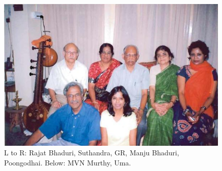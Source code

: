 \begin{figure}[h]
\centering
\includegraphics[width=1\textwidth]{images/Rajaji-family.jpg}
\caption{\small{L to R: Rajat Bhaduri, Suthandra, GR, Manju Bhaduri, Poongodhai.
Below: MVN Murthy, Uma.}}
\end{figure}



